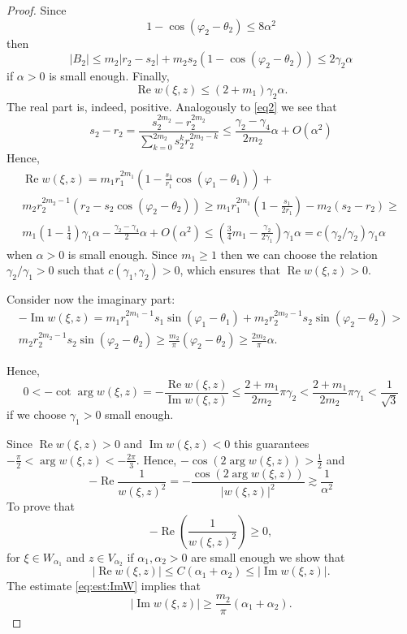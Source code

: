 \documentclass[review]{elsarticle}
\newcommand{\abs}[1]{\left\vert #1 \right\vert}
\newcommand{\RE}{ \mathop{\mathrm{Re}} }
\newcommand{\IM}{ \mathop{\mathrm{Im}}  }
\begin{document}
\begin{proof}
	Since $$1-\cos(\varphi_2-\theta_2) \leq 8\alpha^2$$ then 
	$$|B_2|\leq m_2 \abs{r_2-s_2} + m_2 s_2(1-\cos(\varphi_2-\theta_2))\leq {2\gamma_2}\alpha$$
	if $\alpha>0$ is small enough.
	Finally,
	$$\RE{w(\xi,z)} \leq (2+m_1) \gamma_2\alpha.$$
	The real part is, indeed, positive. 
	Analogously to \eqref{eq2} we see that
	\begin{equation} \label{eq3}
	s_2-r_2= \frac{ s_2^{2m_2}-r_2^{2m_2} }{ \sum\limits_{k=0}^{2m_2} s_2^k r_2^{2m_2-k} } \leq \frac{\gamma_2-\gamma_4}{2m_2} \alpha + O(\alpha^2)
	\end{equation}
	Hence,
	\begin{multline*}
		\RE{w(\xi,z)} = m_1 r_1^{2m_1} \left(1-\frac{s_1}{r_1}\cos(\varphi_1-\theta_1)\right)+\\
		m_2 r_2^{2m_2-1}  \left(r_2-s_2\cos(\varphi_2-\theta_2)\right) \geq
		m_1 r_1^{2m_1} \left(1-\frac{s_1}{2r_1}\right) -
		m_2  \left(s_2-r_2\right) \geq\\
		 m_1\left(1-\frac{1}{4}\right)\gamma_1 \alpha -   \frac{\gamma_{2}-\gamma_4}{2} \alpha +O(\alpha^2)
		 \leq \left(\frac{3}{4} m_1-\frac{\gamma_2}{2\gamma_1}\right)\gamma_1\alpha
		  = c(\gamma_2/\gamma_2)\gamma_1\alpha
	\end{multline*}
 	when $\alpha>0$ is small enough. Since $m_1\geq1$ then 
	we can choose the relation $\gamma_2/\gamma_1>0$ such that $c(\gamma_1,\gamma_2)>0$, which ensures that 
	$\RE w(\xi,z) >0$. %
	
	Consider now the imaginary part:
	\begin{multline}\label{eq:est:ImW}
		-\IM{w(\xi,z)} = m_1 r_1^{2m_1-1} s_1 \sin(\varphi_1-\theta_1) + 
		m_2 r_2^{2m_2-1} s_2 \sin(\varphi_2-\theta_2) > \\
		m_2 r_2^{2m_2-1} s_2 \sin(\varphi_2-\theta_2)\geq  \frac{m_2}{\pi}(\varphi_2-\theta_2) \geq\frac{2m_2}{\pi} \alpha.
	\end{multline}
	
	Hence,
	$$0< -\cot\arg w(\xi,z) =-\frac{\RE w(\xi,z)}{\IM w(\xi,z)} \leq \frac{2+m_1}{2m_2} \pi \gamma_2 < \frac{2+m_1}{2m_2} \pi \gamma_1  < \frac{1}{\sqrt{3} }
	$$
	if we choose $\gamma_1>0$ small enough. 
	
	Since $\RE{w(\xi,z)}>0$ and $\IM {w(\xi,z)}<0$ this guarantees $-\frac{\pi}{2}<\arg w(\xi,z)<-\frac{2\pi}{3}.$ Hence, $-\cos(2\arg w(\xi,z))>\frac{1}{2}$ and
	$$
	-\RE \frac{1}{w(\xi,z)^2} =-\frac{\cos(2\arg w(\xi,z))}{\abs{w(\xi,z)}^2} \gtrsim \frac{1}{\alpha^2}
	$$
	To prove that 
	$$-\RE\left(\frac{1}{w(\xi,z)^2}\right) \geq 0 , $$
	for $\xi\in W_{\alpha_1}$ and $z\in V_{\alpha_2}$ if $\alpha_1, \alpha_2>0$ are small enough we show that 
	$$\abs{\RE{w(\xi,z)}} \leq C(\alpha_1+\alpha_2) \leq \abs{\IM w(\xi,z)}.$$
	The estimate \eqref{eq:est:ImW} implies that
	$$ \abs{\IM w(\xi,z)} \geq \frac{m_2}{\pi}(\alpha_1+\alpha_2).$$
	

\end{proof}
\end{document}
